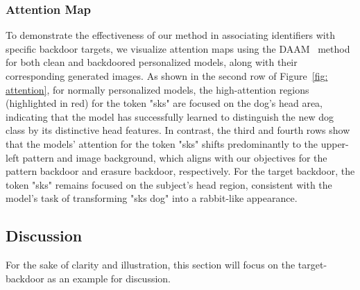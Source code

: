 \subsubsection{Attention Map} To demonstrate the effectiveness of our method in associating identifiers with specific backdoor targets, we visualize attention maps using the DAAM~\cite{tang2023daam} method for both clean and backdoored personalized models, along with their corresponding generated images. As shown in the second row of Figure~\ref{fig: attention}, for normally personalized models, the high-attention regions (highlighted in red) for the token "sks" are focused on the dog's head area, indicating that the model has successfully learned to distinguish the new dog class by its distinctive head features. In contrast, the third and fourth rows show that the models' attention for the token "sks" shifts predominantly to the upper-left pattern and image background, which aligns with our objectives for the pattern backdoor and erasure backdoor, respectively. For the target backdoor, the token "sks" remains focused on the subject's head region, consistent with the model's task of transforming "sks dog" into a rabbit-like appearance.


\subsection{Discussion}
For the sake of clarity and illustration, this section will focus on the target-backdoor as an example for discussion.

\begin{table}[tb]
\centering
\caption{Ablation study of loss components.}
\renewcommand{\arraystretch}{1.1} %
\label{tab: ablation}
\end{table}


